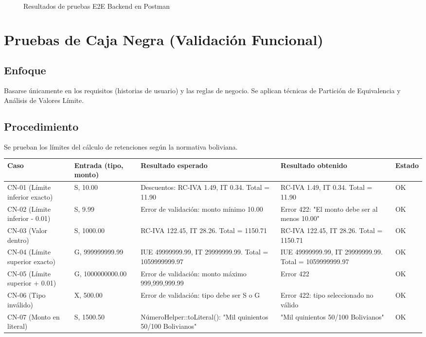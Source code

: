\documentclass[stu]{apa7}
\begin{document}
\begin{figure}[H]
\centering
{}
\caption{Resultados de pruebas E2E Backend en Postman}
\end{figure}

\section{Pruebas de Caja Negra (Validación Funcional)}

\subsection{Enfoque}

Basarse únicamente en los requisitos (historias de usuario) y las reglas de negocio. Se aplican técnicas de Partición de Equivalencia y Análisis de Valores Límite.

\subsection{Procedimiento}

Se prueban los límites del cálculo de retenciones según la normativa boliviana.

\begin{longtable}{|C{1.5cm}|C{3cm}|C{3cm}|C{3cm}|C{2cm}|}
\hline
{}
\textbf{Caso} & \textbf{Entrada (tipo, monto)} & \textbf{Resultado esperado} & \textbf{Resultado obtenido} & \textbf{Estado} \\
\hline
CN-01 (Límite inferior exacto) & S, 10.00 & Descuentos: RC-IVA 1.49, IT 0.34. Total = 11.90 & RC-IVA 1.49, IT 0.34. Total = 11.90 & OK \\
\hline
CN-02 (Límite inferior - 0.01) & S, 9.99 & Error de validación: monto mínimo 10.00 & Error 422: "El monto debe ser al menos 10.00" & OK \\
\hline
CN-03 (Valor dentro) & S, 1000.00 & RC-IVA 122.45, IT 28.26. Total = 1150.71 & RC-IVA 122.45, IT 28.26. Total = 1150.71 & OK \\
\hline
CN-04 (Límite superior exacto) & G, 999999999.99 & IUE 49999999.99, IT 29999999.99. Total = 1059999999.97 & IUE 49999999.99, IT 29999999.99. Total = 1059999999.97 & OK \\
\hline
CN-05 (Límite superior + 0.01) & G, 1000000000.00 & Error de validación: monto máximo 999,999,999.99 & Error 422 & OK \\
\hline
CN-06 (Tipo inválido) & X, 500.00 & Error de validación: tipo debe ser S o G & Error 422: tipo seleccionado no válido & OK \\
\hline
CN-07 (Monto en literal) & S, 1500.50 & NúmeroHelper::toLiteral(): "Mil quinientos 50/100 Bolivianos" & "Mil quinientos 50/100 Bolivianos" & OK \\
\hline
\end{longtable}
\end{document}
